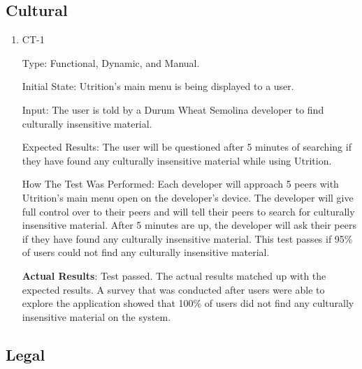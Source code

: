 \documentclass[12pt, titlepage]{article}
\begin{document}
	\subsection{Cultural}
	
	\begin{enumerate}
		\item{CT-1} 
		
		Type: Functional, Dynamic, and Manual.
		
		Initial State: Utrition’s main menu is being displayed to a user.
		
		Input: The user is told by a Durum Wheat Semolina developer to find culturally insensitive material.
		
		Expected Results: The user will be questioned after 5 minutes of searching if they have found any culturally insensitive material while using Utrition.
		
		How The Test Was Performed: Each developer will approach 5 peers with Utrition’s main menu open on the developer’s device. The developer will give full control over to their peers and will tell their peers to search for culturally insensitive material. After 5 minutes are up, the developer will ask their peers if they have found any culturally insensitive material. This test passes if 95\% of users could not find any culturally insensitive material.
		
		\textbf{Actual Results}: Test passed. The actual results matched up with the expected results. A survey that was conducted after users were able to explore the application showed that 100\% of users did not find any culturally insensitive material on the system.
		
	\end{enumerate}

	\subsection{Legal}
	
\end{document}
